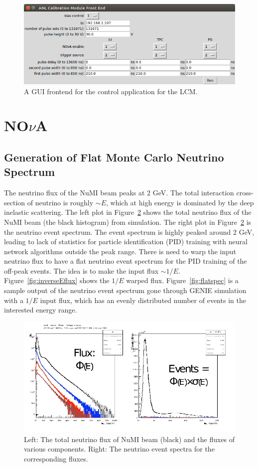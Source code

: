 \documentclass[12pt,a4paper,final]{iopart}
\begin{document}
\begin{figure}
  \centering
  \includegraphics[width=.7\textwidth]{figures/Screenshot_from_2015-09-23_10-49-58.png}
  \caption{A GUI frontend for the control application for the LCM.}
  \label{fig:pulser_frontend}
\end{figure}

\section[NOvA]{NO$\nu$A}

\subsection{Generation of Flat Monte Carlo Neutrino Spectrum}

The neutrino flux of the NuMI beam peaks at 2 GeV. The total interaction cross-section of neutrino is roughly $\sim E$, which at high energy is dominated by the deep inelastic scattering. The left plot in Figure~\ref{fig:NuMISpec} shows the total neutrino flux of the NuMI beam (the black histogram) from simulation. The right plot in Figure~\ref{fig:NuMISpec} is the neutrino event spectrum. The event spectrum is highly peaked around 2 GeV, leading to lack of statistics for particle identification (PID) training with neural network algorithms outside the peak range. There is need to warp the input neutrino flux to have a flat neutrino event spectrum for the PID training of the off-peak events. The idea is to make the input flux $\sim1/E$. Figure~\ref{fig:inverseEflux} shows the $1/E$ warped flux. Figure~\ref{fig:flatspec} is a sample output of the neutrino event spectrum gone through GENIE simulation with a $1/E$ input flux, which has an evenly distributed number of events in the interested energy range.

\begin{figure}
  \centering
  \includegraphics[width=.7\textwidth]{figures/NuMI_spectrum.jpg}
  \caption{Left: The total neutrino flux of NuMI beam (black) and the fluxes of various components. Right: The neutrino event spectra for the corresponding fluxes.}
  \label{fig:NuMISpec}
\end{figure}
\end{document}
